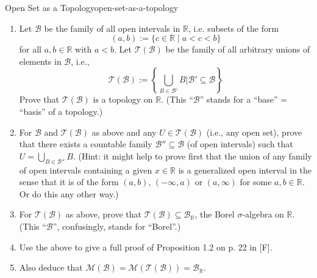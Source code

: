 \begin{mystexercise}{Open Set as a Topology}{open-set-as-a-topology}\label{Open Set as a Topology}\label{open set as a topology}\begin{enumerate}
\item Let $\mathcal{B}$ be the family of all open intervals in $\mathbb{R}$, i.e. subsets of the form
\begin{equation}
(a, b) := \{c \in \mathbb{R} \mid a < c < b\}
\end{equation}
for all $a, b \in \mathbb{R}$ with $a < b$. Let $\mathcal{T}(\mathcal{B})$ be the family of all arbitrary unions of elements in $\mathcal{B}$, i.e.,
\begin{equation}
\mathcal{T}(\mathcal{B}) := \left\{ \bigcup_{B \in \mathcal{B}'} B \mathrel{\Big\vert{}} \mathcal{B}' \subseteq \mathcal{B} \right\}
\end{equation}
Prove that $\mathcal{T}(\mathcal{B})$ is a topology on $\mathbb{R}$. (This ``$\mathcal{B}$'' stands for a ``base'' = ``basis'' of a topology.)


\item For $\mathcal{B}$ and $\mathcal{T}(\mathcal{B})$ as above and any $U \in \mathcal{T}(\mathcal{B})$ (i.e., any open set), prove that there exists a countable family $\mathcal{B}'' \subseteq \mathcal{B}$ (of open intervals) such that $U = \bigcup_{B \in \mathcal{B}''} B$. (Hint: it might help to prove first that the union of any family of open intervals containing a given $x \in \mathbb{R}$ is a generalized open interval in the sense that it is of the form $(a, b)$, $( -\infty, a)$ or $(a, \infty)$ for some $a, b \in \mathbb{R}$. Or do this any other way.)
\item For $\mathcal{T}(\mathcal{B})$ as above, prove that $\mathcal{T}(\mathcal{B}) \subseteq \mathcal{B}_{\mathbb{R}}$, the Borel $\sigma$-algebra on $\mathbb{R}$. (This ``$\mathcal{B}$'', confusingly, stands for ``Borel''.)
\item Use the above to give a full proof of Proposition 1.2 on p. 22 in [F].
\item Also deduce that $\mathcal{M}(\mathcal{B}) = \mathcal{M}(\mathcal{T}(\mathcal{B})) = \mathcal{B}_{\mathbb{R}}$.
\end{enumerate}

\end{mystexercise}
